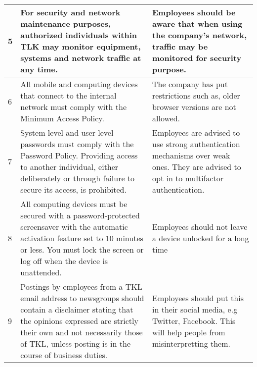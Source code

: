 \documentclass{article}
\begin{document}
\begin{center}
\begin{longtable}{|p{1cm}|p{5cm}|p{5cm}|}
        5
         &
        For security and network maintenance purposes, authorized individuals within
        TLK may monitor equipment, systems and network traffic at any time.
         &
        Employees should be aware that when using the company's network, traffic may be monitored for security purpose.                                                                                       \\
        \hline

        6
         &
        All mobile and computing devices that connect to the internal network must comply with the Minimum Access Policy.
         &
        The company has put restrictions such as, older browser versions are not allowed.                                                                                                                     \\
        \hline

        7
         &
        System level and user level passwords must comply with the Password Policy. Providing
        access to another individual, either deliberately or through failure to secure its access, is
        prohibited.
         &
        Employees are advised to use strong authentication mechanisms over weak ones. They are advised to opt in to multifactor authentication.                                                               \\
        \hline

        8
         &
        All computing devices must be secured with a password-protected screensaver with the
        automatic activation feature set to 10 minutes or less. You must lock the screen or log off
        when the device is unattended.
         &
        Employees should not leave a device unlocked for a long time                                                                                                                                          \\
        \hline

        9
         &
        Postings by employees from a TKL email address to newsgroups should
        contain a disclaimer stating that the opinions expressed are strictly their own and not
        necessarily those of TKL, unless posting is in the course of business duties.
         &
        Employees should put this in their social media, e.g Twitter, Facebook. This will help people from misinterpretting them.                                                                             \\
        \hline


\end{longtable}
\end{center}
\end{document}
